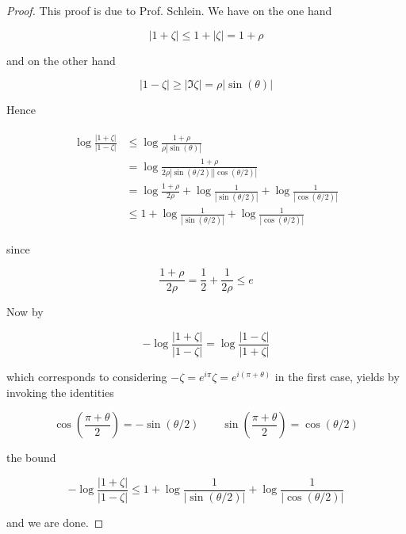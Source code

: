 \begin{proof}
	This proof is due to Prof. Schlein. We have on the one hand

	\begin{equation*}
		\left| 1 + \zeta \right| \leqslant 1 + \left| \zeta \right| = 1 + \rho
	\end{equation*}

	and on the other hand

	\begin{equation*}
		\left| 1 - \zeta \right| \geqslant \left|\Im\zeta \right| = \rho\left|\sin(\theta)\right|
	\end{equation*}

	Hence
	
	\begin{gather*}
		\begin{aligned}
			\log \frac{\left| 1 + \zeta \right|}{\left| 1 - \zeta \right|} &\leqslant \log\frac{1 + \rho}{\rho \left| \sin(\theta)\right|}\\
			&=  \log\frac{1 + \rho}{2\rho \left| \sin(\theta/2)\right|\left| \cos(\theta/2)\right|}\\
			&=  \log\frac{1 + \rho}{2\rho}  +  \log \frac{1}{\left| \sin(\theta/2)\right|} +  \log\frac{1}{\left| \cos(\theta/2)\right|}\\
			&\leqslant  1 + \log \frac{1}{\left| \sin(\theta/2)\right|} + \log \frac{1}{\left| \cos(\theta/2)\right|}	
		\end{aligned}
	\end{gather*}

	since

	\begin{equation*}
		\frac{1 + \rho}{2\rho} = \frac{1}{2} + \frac{1}{2\rho} \leqslant e
	\end{equation*}

	Now by

	\begin{equation*}
		-\log \frac{\left| 1 + \zeta \right|}{\left| 1 - \zeta \right|}  = 	\log \frac{\left| 1 - \zeta \right|}{\left| 1 + \zeta \right|} 
	\end{equation*}

	which corresponds to considering $-\zeta = e^{i\pi}\zeta = e^{i(\pi + \theta)}$ in the first case, yields by invoking the identities

	\begin{equation*}
		\cos\left( \frac{\pi + \theta}{2}\right) = -\sin(\theta/2) \qquad \sin\left( \frac{\pi + \theta}{2} \right) = \cos(\theta/2)
	\end{equation*}

	the bound 

	\begin{equation*}
		-\log \frac{\left| 1 + \zeta \right|}{\left| 1 - \zeta \right|} \leqslant 1 + \log \frac{1}{\left| \sin(\theta/2)\right|} + \log \frac{1}{\left| \cos(\theta/2)\right|}	 
	\end{equation*}

	and we are done.
\end{proof}

